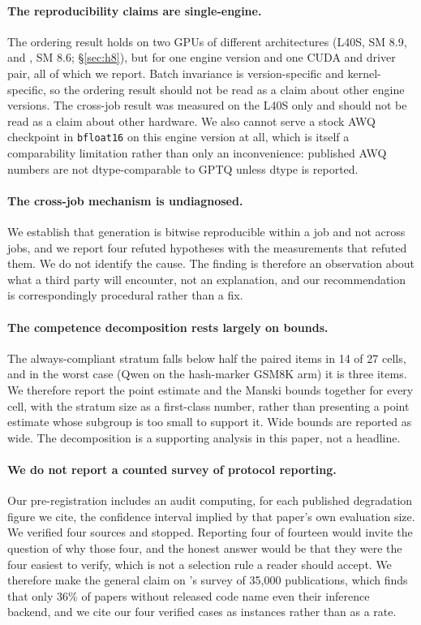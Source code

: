 \documentclass[11pt]{article}
\begin{document}
\paragraph{The reproducibility claims are single-engine.}
The ordering result holds on two GPUs of different architectures (L40S, SM 8.9, and
\hEightSpotGPU, SM 8.6; \S\ref{sec:h8}), but for one engine version and one CUDA and
driver pair, all of which we report. Batch invariance is version-specific and
kernel-specific, so the ordering result should not be read as a claim about other engine
versions. The cross-job result was measured on the L40S only and should not be read as a
claim about other hardware. We also cannot
serve a stock AWQ checkpoint in \texttt{bfloat16} on this engine version at all,
which is itself a comparability limitation rather than only an inconvenience:
published AWQ numbers are not dtype-comparable to GPTQ unless dtype is reported.

\paragraph{The cross-job mechanism is undiagnosed.}
We establish that generation is bitwise reproducible within a job and not across
jobs, and we report four refuted hypotheses with the measurements that refuted
them. We do not identify the cause. The finding is therefore an observation about
what a third party will encounter, not an explanation, and our recommendation is
correspondingly procedural rather than a fix.

\paragraph{The competence decomposition rests largely on bounds.}
The always-compliant stratum falls below half the paired items in 14 of 27 cells,
and in the worst case (Qwen on the hash-marker GSM8K arm) it is three items. We
therefore report the point estimate and the Manski bounds together for every cell,
with the stratum size as a first-class number, rather than presenting a point
estimate whose subgroup is too small to support it. Wide bounds are reported as
wide. The decomposition is a supporting analysis in this paper, not a headline.

\paragraph{We do not report a counted survey of protocol reporting.}
Our pre-registration includes an audit computing, for each published degradation
figure we cite, the confidence interval implied by that paper's own evaluation
size. We verified four sources and stopped. Reporting four of fourteen would
invite the question of why those four, and the honest answer would be that they
were the four easiest to verify, which is not a selection rule a reader should
accept. We therefore make the general claim on \citet{pape2026silent}'s survey of
35{,}000 publications, which finds that only 36\% of papers without released code
name even their inference backend, and we cite our four verified cases as
instances rather than as a rate.
\end{document}
